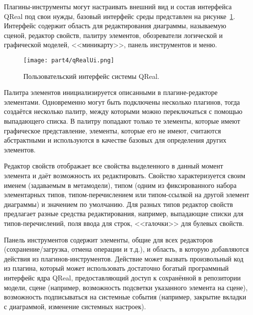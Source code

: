 Плагины-инструменты могут настраивать внешний вид и состав интерфейса QReal под свои 
нужды, базовый интерфейс среды представлен на рисунке~\ref{qRealUi}. Интерфейс содержит 
область для редактирования диаграммы, называемую сценой, редактор свойств, палитру 
элементов, обозреватели логической и графической моделей, <<миникарту>>, панель инструментов и меню.

\begin{figure} [ht]
	\begin{center}
		\texttt{[image: part4/qRealUi.png]}
		\caption{Пользовательский интерфейс системы QReal.}
		\label{qRealUi}
	\end{center}
\end{figure}

Палитра элементов инициализируется описанными в плагине-редакторе элементами. Одновременно 
могут быть подключены несколько плагинов, тогда создаётся  несколько палитр, между 
которыми можно переключаться с помощью выпадающего списка. В палитру попадают только 
те элементы, которые имеют графическое представление, элементы, которые его не имеют, 
считаются абстрактными и используются в качестве базовых для определения других элементов.

Редактор свойств отображает все свойства выделенного в данный момент элемента и даёт 
возможность их редактировать. Свойство характеризуется своим именем (задаваемым в метамодели), 
типом (одним из фиксированного набора элементарных типов, типом-перечислением или 
типом-ссылкой на другой элемент диаграммы) и значением по умолчанию. Для разных типов 
редактор свойств предлагает разные средства редактирования, например, выпадающие списки 
для типов-перечислений, поля ввода для строк, <<галочки>> для булевых свойств.

Панель инструментов содержит элементы, общие для всех редакторов (сохранение/загрузка, 
отмена операции и т.д.), и область, в которую добавляются действия из плагинов-инструментов. 
Действие может вызвать произвольный код из плагина, который может использовать достаточно 
богатый программный интерфейс ядра QReal, предоставляющий доступ к сохранённой в репозитории 
модели, сцене (например, возможность подсветки указанного элемента на сцене), возможность 
подписываться на системные события (например, закрытие вкладки с диаграммой, изменение 
системных настроек).

